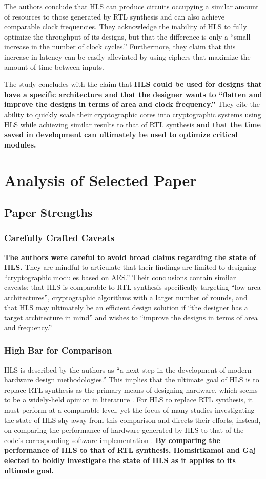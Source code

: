 \documentclass[12pt,journal,compsoc,onecolumn]{IEEEtran}
\begin{document}
The authors conclude that HLS can produce circuits occupying a similar amount of resources to those generated by RTL synthesis and can also achieve comparable clock frequencies. They acknowledge the inability of HLS to fully optimize the throughput of its designs, but that the difference is only a ``small increase in the number of clock cycles.'' Furthermore, they claim that this increase in latency can be easily alleviated by using ciphers that maximize the amount of time between inputs.

The study concludes with the claim that \textbf{HLS could be used for designs that have a specific architecture and that the designer wants to ``flatten and improve the designs in terms of area and clock frequency.''} They cite the ability to quickly scale their cryptographic cores into cryptographic systems using HLS while achieving similar results to that of RTL synthesis \textbf{and that the time saved in development can ultimately be used to optimize critical modules.}

\section{Analysis of Selected Paper}
\subsection{Paper Strengths}
\subsubsection{Carefully Crafted Caveats}
\textbf{The authors were careful to avoid broad claims regarding the state of HLS.} They are mindful to articulate that their findings are limited to designing ``cryptographic modules based on AES.'' Their conclusions contain similar caveats: that HLS is comparable to RTL synthesis specifically targeting ``low-area architectures'', cryptographic algorithms with a larger number of rounds, and that HLS may ultimately be an efficient design solution if ``the designer has a target architecture in mind'' and wishes to ``improve the designs in terms of area and frequency.''
\subsubsection{High Bar for Comparison}\label{sec:highbar}

HLS is described by the authors as ``a next step in the development of modern hardware design methodologies.'' This implies that the ultimate goal of HLS is to replace RTL synthesis as the primary means of designing hardware, which seems to be a widely-held opinion in literature \cite{1}\cite{3}\cite{4}. For HLS to replace RTL synthesis, it must perform at a comparable level, yet the focus of many studies investigating the state of HLS shy away from this comparison and directs their efforts, instead, on comparing the performance of hardware generated by HLS to that of the code's corresponding software implementation \cite{skalicky}\cite{3}\cite{4}. \textbf{By comparing the performance of HLS to that of RTL synthesis, Homsirikamol and Gaj elected to boldly investigate the state of HLS as it applies to its ultimate goal.}
\end{document}
